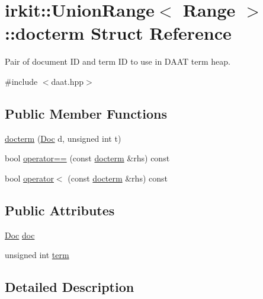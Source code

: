 \hypertarget{structirkit_1_1UnionRange_1_1docterm}{}\section{irkit\+:\+:Union\+Range$<$ Range $>$\+:\+:docterm Struct Reference}
\label{structirkit_1_1UnionRange_1_1docterm}


Pair of document ID and term ID to use in D\+A\+AT term heap.  




{\ttfamily \#include $<$daat.\+hpp$>$}

\subsection*{Public Member Functions}
\begin{DoxyCompactItemize}
\item 
\mbox{\hyperlink{structirkit_1_1UnionRange_1_1docterm_a5a45bee16d82935e804cf2a0a492a3c5}{docterm}} (\mbox{\hyperlink{classirkit_1_1UnionRange_a387589b1f09868b60485c4ab8c61f97a}{Doc}} d, unsigned int t)
\item 
bool \mbox{\hyperlink{structirkit_1_1UnionRange_1_1docterm_a089cce245934c7558deb5e9405f36e65}{operator==}} (const \mbox{\hyperlink{structirkit_1_1UnionRange_1_1docterm}{docterm}} \&rhs) const
\item 
bool \mbox{\hyperlink{structirkit_1_1UnionRange_1_1docterm_a5f4842c5758933c11d28a00aa5a66262}{operator$<$}} (const \mbox{\hyperlink{structirkit_1_1UnionRange_1_1docterm}{docterm}} \&rhs) const
\end{DoxyCompactItemize}
\subsection*{Public Attributes}
\begin{DoxyCompactItemize}
\item 
\mbox{\hyperlink{classirkit_1_1UnionRange_a387589b1f09868b60485c4ab8c61f97a}{Doc}} \mbox{\hyperlink{structirkit_1_1UnionRange_1_1docterm_a4fe1c3b4721f619f688189d6b5e4afe2}{doc}}
\item 
unsigned int \mbox{\hyperlink{structirkit_1_1UnionRange_1_1docterm_aa8219ac3bc95a63da177aaf0689eaff0}{term}}
\end{DoxyCompactItemize}


\subsection{Detailed Description}
